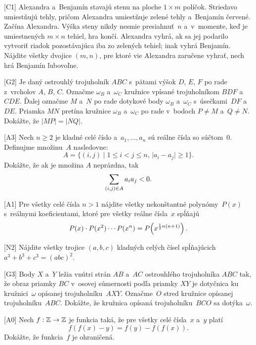 {%
[C1] Alexandra a~Benjamín stavajú stenu na ploche $1 \times m$ políčok. Striedavo umiestňujú tehly, pričom Alexandra umiestňuje zelené tehly a~Benjamín červené. Začína Alexandra. Výška steny nikdy nesmie presiahnuť~$n$ a~v~momente, keď je umiestnených $m \times n$ tehiel, hra končí. Alexandra vyhrá, ak sa jej podarilo vytvoriť riadok pozostávajúca iba zo zelených tehiel; inak vyhrá Benjamín. Nájdite všetky dvojice $(m, n)$, pre ktoré vie Alexandra zaručene vyhrať, nech hrá Benjamín ľubovoľne.}

{%
[G2] Je daný ostrouhlý trojuholník $ABC$ s~pätami výšok $D$, $E$, $F$ po rade z~vrcholov $A$, $B$, $C$. Označme $\omega_B$ a~$\omega_C$ kružnice vpísané trojuholníkom $BDF$ a~$CDE$. Ďalej označme $M$ a~$N$ po rade dotykové body $\omega_B$ a~$\omega_C$ s~úsečkami~$DF$ a~$DE$. Priamka $MN$ pretína kružnice $\omega_B$ a~$\omega_C$ po rade v~bodoch $P \ne M$ a~$Q \ne N$. Dokážte, že $|MP|=|NQ|$.}

{%
[A3] Nech $n \ge 2$ je kladné celé číslo a~$a_1,\ldots,a_n$ sú reálne čísla so súčtom~0. Definujme množinu~$A$ nasledovne:
$$
A=\{(i,j)\;|\;1 \leq i < j \leq n,\,|a_i-a_j|\ge 1\}.
$$
Dokážte, že ak je množina $A$ neprázdna, tak
$$
\sum_{(i,j)\in A} a_i a_j < 0.
\belowdisplayskip0pt
$$}

{%
[A1] Pre všetky celé čísla $n>1$ nájdite všetky nekonštantné polynómy~$P(x)$ s~reálnymi koeficientami, ktoré pre všetky reálne čísla~$x$ spĺňajú
$$
P(x)\cdot P(x^2) \cdots P(x^n) = P\!\left(x^{\frac12n(n+1)}\right).
\belowdisplayskip0pt
$$}

{%
[N2] Nájdite všetky trojice $(a,b,c)$ kladných celých čísel spĺňajúcich $a^3+b^3+c^3=(abc)^2$.}

{%
[G3] Body $X$ a~$Y$ ležia vnútri strán $AB$ a~$AC$ ostrouhlého trojuholníka $ABC$ tak, že obraz priamky $BC$ v~osovej súmernosti podľa priamky $XY$ je dotyčnica ku kružnici~$\omega$ opísanej trojuholníku~$AXY$. Označme~$O$ stred kružnice opísanej trojuholníku~$ABC$. Dokážte, že kružnica opísaná trojuholníku~$BCO$ sa dotýka~$\omega$.}

{%
[A0] Nech $f : {\Bbb Z} \to {\Bbb Z}$ je funkcia taká, že pre všetky celé čísla~$x$ a~$y$ platí
$$
f(f(x)-y)=f(y)-f(f(x)).
$$
Dokážte, že funkcia~$f$ je ohraničená.}

